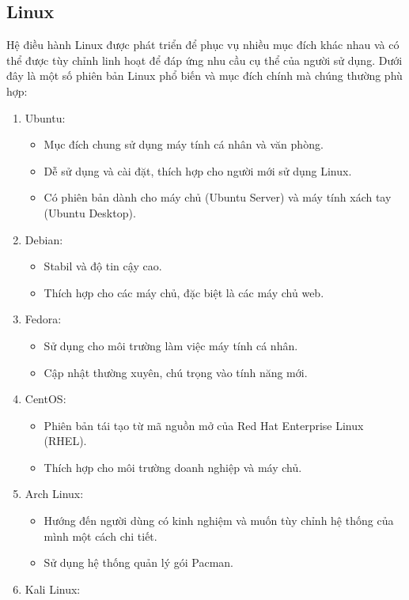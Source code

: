 \documentclass[12pt,a4paper]{article}
\begin{document}
\subsection{Linux}
Hệ điều hành Linux được phát triển để phục vụ nhiều mục đích khác nhau và có thể được tùy chỉnh linh hoạt để đáp ứng nhu cầu cụ thể của người sử dụng. Dưới đây là một số phiên bản Linux phổ biến và mục đích chính mà chúng thường phù hợp:\\
\begin{enumerate}
	\item Ubuntu:
	\begin{itemize}
		\item [] Mục đích chung sử dụng máy tính cá nhân và văn phòng.
		\item [] Dễ sử dụng và cài đặt, thích hợp cho người mới sử dụng Linux.
		\item [] Có phiên bản dành cho máy chủ (Ubuntu Server) và máy tính xách tay (Ubuntu Desktop).
	\end{itemize}
	\item Debian:
		\begin{itemize}
		\item [] Stabil và độ tin cậy cao.
		\item [] Thích hợp cho các máy chủ, đặc biệt là các máy chủ web.
		\end{itemize}
	\item Fedora:
		\begin{itemize}
		\item [] Sử dụng cho môi trường làm việc máy tính cá nhân.
		\item [] Cập nhật thường xuyên, chú trọng vào tính năng mới.
		\end{itemize}
	\item CentOS:
		\begin{itemize}
		\item [] Phiên bản tái tạo từ mã nguồn mở của Red Hat Enterprise Linux (RHEL).
		\item [] Thích hợp cho môi trường doanh nghiệp và máy chủ.
		\end{itemize}
	\item Arch Linux:
		\begin{itemize}
		\item [] Hướng đến người dùng có kinh nghiệm và muốn tùy chỉnh hệ thống của mình một cách chi tiết.
		\item [] Sử dụng hệ thống quản lý gói Pacman.
		\end{itemize}
	\item Kali Linux:

\end{enumerate}
\end{document}
